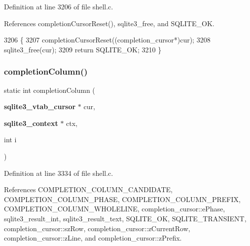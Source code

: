 Definition at line 3206 of file shell.\+c.



References completion\+Cursor\+Reset(), sqlite3\+\_\+free, and S\+Q\+L\+I\+T\+E\+\_\+\+OK.


\begin{DoxyCode}
3206                                                     \{
3207   completionCursorReset((completion_cursor*)cur);
3208   sqlite3_free(cur);
3209   \textcolor{keywordflow}{return} SQLITE_OK;
3210 \}
\end{DoxyCode}
\mbox{\label{shell_8c_a626602ebdb59f4829f1c5940a63d9c45}} 
\subsubsection{completion\+Column()}
{\footnotesize\ttfamily static int completion\+Column (\begin{DoxyParamCaption}\item[{\textbf{ sqlite3\+\_\+vtab\+\_\+cursor} $\ast$}]{cur,  }\item[{\textbf{ sqlite3\+\_\+context} $\ast$}]{ctx,  }\item[{int}]{i }\end{DoxyParamCaption})\hspace{0.3cm}{\ttfamily [static]}}



Definition at line 3334 of file shell.\+c.



References C\+O\+M\+P\+L\+E\+T\+I\+O\+N\+\_\+\+C\+O\+L\+U\+M\+N\+\_\+\+C\+A\+N\+D\+I\+D\+A\+TE, C\+O\+M\+P\+L\+E\+T\+I\+O\+N\+\_\+\+C\+O\+L\+U\+M\+N\+\_\+\+P\+H\+A\+SE, C\+O\+M\+P\+L\+E\+T\+I\+O\+N\+\_\+\+C\+O\+L\+U\+M\+N\+\_\+\+P\+R\+E\+F\+IX, C\+O\+M\+P\+L\+E\+T\+I\+O\+N\+\_\+\+C\+O\+L\+U\+M\+N\+\_\+\+W\+H\+O\+L\+E\+L\+I\+NE, completion\+\_\+cursor\+::e\+Phase, sqlite3\+\_\+result\+\_\+int, sqlite3\+\_\+result\+\_\+text, S\+Q\+L\+I\+T\+E\+\_\+\+OK, S\+Q\+L\+I\+T\+E\+\_\+\+T\+R\+A\+N\+S\+I\+E\+NT, completion\+\_\+cursor\+::sz\+Row, completion\+\_\+cursor\+::z\+Current\+Row, completion\+\_\+cursor\+::z\+Line, and completion\+\_\+cursor\+::z\+Prefix.


